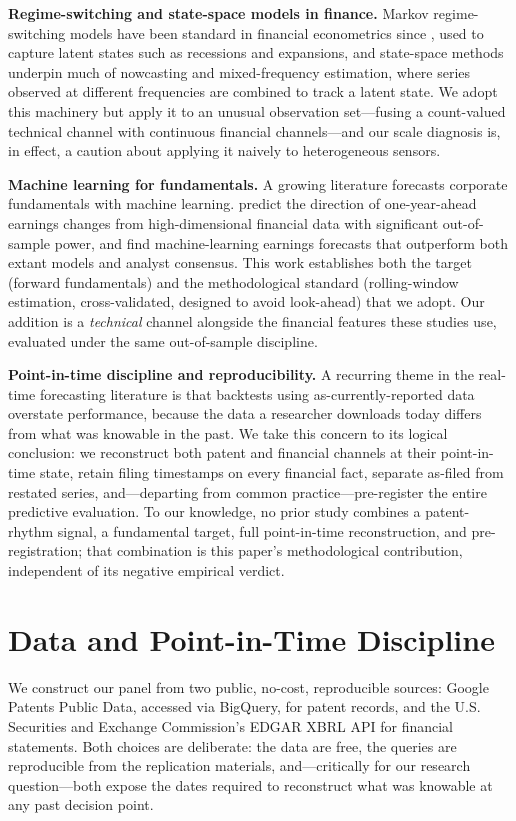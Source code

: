 \documentclass[11pt]{article}
\begin{document}
\textbf{Regime-switching and state-space models in finance.} Markov regime-switching models have been standard in financial econometrics since \citet{hamilton1989}, used to capture latent states such as recessions and expansions, and state-space methods underpin much of nowcasting and mixed-frequency estimation, where series observed at different frequencies are combined to track a latent state. We adopt this machinery but apply it to an unusual observation set---fusing a count-valued technical channel with continuous financial channels---and our scale diagnosis is, in effect, a caution about applying it naively to heterogeneous sensors.

\textbf{Machine learning for fundamentals.} A growing literature forecasts corporate fundamentals with machine learning. \citet{chen2022} predict the direction of one-year-ahead earnings changes from high-dimensional financial data with significant out-of-sample power, and \citet{cao2024} find machine-learning earnings forecasts that outperform both extant models and analyst consensus. This work establishes both the target (forward fundamentals) and the methodological standard (rolling-window estimation, cross-validated, designed to avoid look-ahead) that we adopt. Our addition is a \emph{technical} channel alongside the financial features these studies use, evaluated under the same out-of-sample discipline.

\textbf{Point-in-time discipline and reproducibility.} A recurring theme in the real-time forecasting literature is that backtests using as-currently-reported data overstate performance, because the data a researcher downloads today differs from what was knowable in the past. We take this concern to its logical conclusion: we reconstruct both patent and financial channels at their point-in-time state, retain filing timestamps on every financial fact, separate as-filed from restated series, and---departing from common practice---pre-register the entire predictive evaluation. To our knowledge, no prior study combines a patent-rhythm signal, a fundamental target, full point-in-time reconstruction, and pre-registration; that combination is this paper's methodological contribution, independent of its negative empirical verdict.

\section{Data and Point-in-Time Discipline}

We construct our panel from two public, no-cost, reproducible sources: Google Patents Public Data, accessed via BigQuery, for patent records, and the U.S. Securities and Exchange Commission's EDGAR XBRL API for financial statements. Both choices are deliberate: the data are free, the queries are reproducible from the replication materials, and---critically for our research question---both expose the dates required to reconstruct what was knowable at any past decision point.
\end{document}
